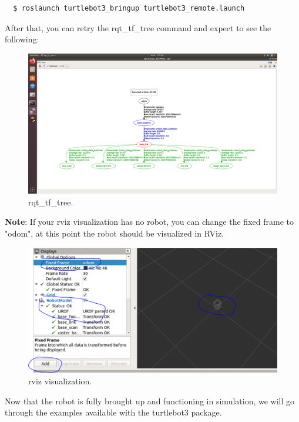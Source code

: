 \documentclass[12pt]{article}
\begin{document}
\begin{enumerate}
\begin{verbatim}
  $ roslaunch turtlebot3_bringup turtlebot3_remote.launch
\end{verbatim}

After that, you can retry the rqt\_tf\_tree command and expect to see the following:
\begin{figure}[H]
  \vspace{-10pt}
  \centering\includegraphics[width=14cm]{images/rqf.png}\vspace{-10pt}
  \caption{rqt\_tf\_tree.}\label{fig:rqt}
  \end{figure}

\textbf{Note}: If your rviz visualization has no robot, you can change the fixed frame to "odom", at this point the robot should be visualized in RViz.
\begin{figure}[H]
  \vspace{-10pt}
  \centering\includegraphics[width=14cm]{images/rviz.png}\vspace{-10pt}
  \caption{rviz visualization.}\label{fig:rqt1}
  \end{figure}

Now that the robot is fully brought up and functioning in simulation, we will go through the examples available with the turtlebot3 package.

\end{enumerate}
\end{document}
